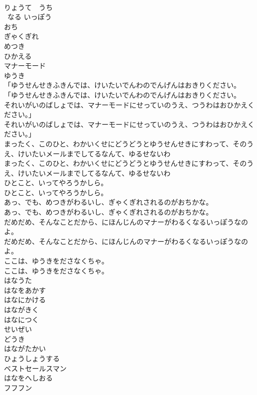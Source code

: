 \documentclass[8pt]{extreport}
\begin{document}
\begin{CJK}{UTF8}{min}
\\	りょうて　うち
\\	~なる いっぽう
\\	おち
\\	ぎゃくぎれ
\\	めつき
\\	ひかえる
\\	マナーモード
\\	ゆうき
\\	「ゆうせんせきふきんでは、けいたいでんわのでんげんはおきりください。
\\	「ゆうせんせきふきんでは、けいたいでんわのでんげんはおきりください。
\\	それいがいのばしょでは、マナーモードにせっていのうえ、つうわはおひかえください。」
\\	それいがいのばしょでは、マナーモードにせっていのうえ、つうわはおひかえください。」
\\	まったく、このひと、わかいくせにどうどうとゆうせんせきにすわって、そのうえ、けいたいメールまでしてるなんて、ゆるせないわ
\\	まったく、このひと、わかいくせにどうどうとゆうせんせきにすわって、そのうえ、けいたいメールまでしてるなんて、ゆるせないわ
\\	ひとこと、いってやろうかしら。
\\	ひとこと、いってやろうかしら。
\\	あっ、でも、めつきがわるいし、ぎゃくぎれされるのがおちかな。
\\	あっ、でも、めつきがわるいし、ぎゃくぎれされるのがおちかな。
\\	だめだめ、そんなことだから、にほんじんのマナーがわるくなるいっぽうなのよ。
\\	だめだめ、そんなことだから、にほんじんのマナーがわるくなるいっぽうなのよ。
\\	ここは、ゆうきをださなくちゃ。
\\	ここは、ゆうきをださなくちゃ。
\\	はなうた
\\	はなをあかす
\\	はなにかける
\\	はながきく
\\	はなにつく
\\	せいぜい
\\	どうき
\\	はながたかい
\\	ひょうしょうする
\\	ベストセールスマン
\\	はなをへしおる
\\	フフフン

\end{CJK}
\end{document}
